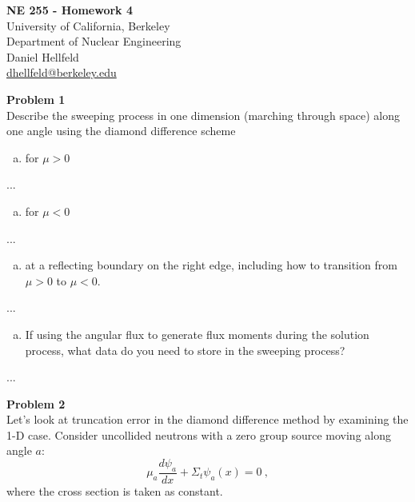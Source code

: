 \documentclass[10pt]{article}
\begin{document}
\begin{centering}
\textbf{\large NE 255 - Homework 4}\\
\vspace{10pt}
University of California, Berkeley\\
Department of Nuclear Engineering\\
\vspace{10pt}
Daniel Hellfeld\\
\href{mailto:dhellfeld@berkeley.edu}{dhellfeld@berkeley.edu}\\
\end{centering}




\vspace{20pt}
\noindent \textbf{Problem 1}\\
Describe the sweeping process in one dimension (marching through space) along one angle using the diamond difference scheme
%
\begin{enumerate}[(a)]
\item for $\mu > 0$
\end{enumerate}

...

\begin{enumerate}[(b)]
\item for $\mu < 0$
\end{enumerate}

...


\begin{enumerate}[(c)]
\item at a reflecting boundary on the right edge, including how to transition from $\mu > 0$ to $\mu < 0$.
\end{enumerate}

...


\begin{enumerate}[(d)]
\item If using the angular flux to generate flux moments during the solution process, what data do you need to store in the sweeping process?  
\end{enumerate}

...




\newpage
\noindent \textbf{Problem 2}\\
Let's look at truncation error in the diamond difference method by examining the 1-D case. Consider uncollided neutrons with a zero group source moving along angle $a$:
%
\begin{equation*}
\mu_a \frac{d \psi_a}{dx} + \Sigma_t \psi_a(x) = 0\:,
\end{equation*}
where the cross section is taken as constant. 
\end{document}
